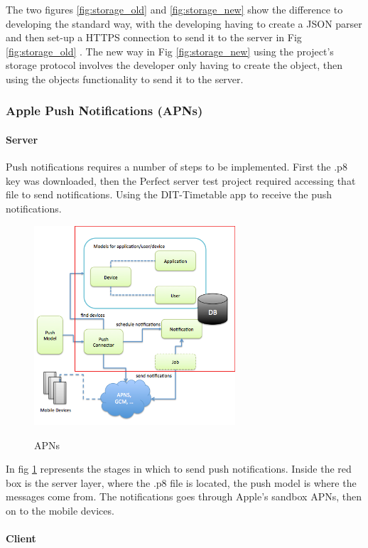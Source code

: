 The two figures \ref{fig:storage_old} and \ref{fig:storage_new} show the difference to developing the standard way, with the developing having to create a JSON parser and then set-up a HTTPS connection to send it to the server in Fig \ref{fig:storage_old} . The new way in Fig \ref{fig:storage_new} using the project's storage protocol involves the developer only having to create the object, then using the objects functionality to send it to the server.

\subsubsection{Apple Push Notifications (APNs)}

\paragraph{Server}

Push notifications requires a number of steps to be implemented. First the .p8 key was downloaded, then the Perfect server test project required accessing that file to send notifications. Using the DIT-Timetable app to receive the push notifications.  

\begin{figure}[!h]
    \caption{APNs \cite{apns}}
    \centering
    \includegraphics[width=75mm]{images/APNs}
    \label{fig:apns}
\end{figure}

In fig \ref{fig:apns} represents the stages in which to send push notifications. Inside the red box is the server layer, where the .p8 file is located, the push model is where the messages come from. The notifications goes through Apple's sandbox APNs, then on to the mobile devices.

\paragraph{Client}

